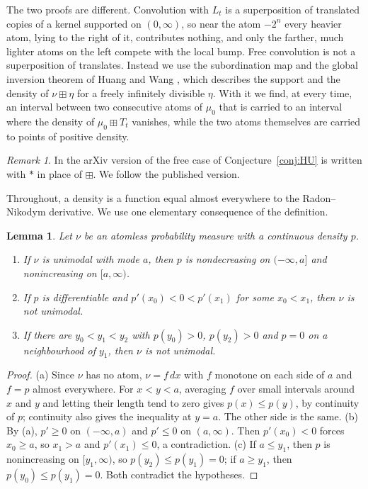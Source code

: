 \documentclass[11pt]{amsart}
\newtheorem{lemma}[theorem]{Lemma}
\theoremstyle{definition}
\theoremstyle{remark}
\newtheorem{remark}[theorem]{Remark}
\numberwithin{equation}{section}
\newcommand{\bp}{\boxplus}
\begin{document}
The two proofs are different. Convolution with $L_t$ is a superposition of translated copies of a kernel supported on $(0,\infty)$, so near the atom $-2^n$ every heavier atom, lying to the right of it, contributes nothing, and only the farther, much lighter atoms on the left compete with the local bump. Free convolution is not a superposition of translates. Instead we use the subordination map and the global inversion theorem of Huang and Wang \cite{HW}, which describes the support and the density of $\nu\bp\eta$ for a freely infinitely divisible $\eta$. With it we find, at every time, an interval between two consecutive atoms of $\mu_0$ that is carried to an interval where the density of $\mu_0\bp T_t$ vanishes, while the two atoms themselves are carried to points of positive density.

\begin{remark}
In the arXiv version of \cite{HU18} the free case of Conjecture~\ref{conj:HU} is written with $*$ in place of $\bp$. We follow the published version.
\end{remark}

Throughout, a density is a function equal almost everywhere to the Radon--Nikodym derivative. We use one elementary consequence of the definition.

\begin{lemma}\label{lem:unimodal}
Let $\nu$ be an atomless probability measure with a continuous density $p$.
\begin{enumerate}[label=(\alph*)]
\item If $\nu$ is unimodal with mode $a$, then $p$ is nondecreasing on $(-\infty,a]$ and nonincreasing on $[a,\infty)$.
\item If $p$ is differentiable and $p'(x_0)<0<p'(x_1)$ for some $x_0<x_1$, then $\nu$ is not unimodal.
\item If there are $y_0<y_1<y_2$ with $p(y_0)>0$, $p(y_2)>0$ and $p=0$ on a neighbourhood of $y_1$, then $\nu$ is not unimodal.
\end{enumerate}
\end{lemma}

\begin{proof}
(a) Since $\nu$ has no atom, $\nu=f\,dx$ with $f$ monotone on each side of $a$ and $f=p$ almost everywhere. For $x<y<a$, averaging $f$ over small intervals around $x$ and $y$ and letting their length tend to zero gives $p(x)\le p(y)$, by continuity of $p$; continuity also gives the inequality at $y=a$. The other side is the same. (b) By (a), $p'\ge0$ on $(-\infty,a)$ and $p'\le0$ on $(a,\infty)$. Then $p'(x_0)<0$ forces $x_0\ge a$, so $x_1>a$ and $p'(x_1)\le0$, a contradiction. (c) If $a\le y_1$, then $p$ is nonincreasing on $[y_1,\infty)$, so $p(y_2)\le p(y_1)=0$; if $a\ge y_1$, then $p(y_0)\le p(y_1)=0$. Both contradict the hypotheses.
\end{proof}
\end{document}
